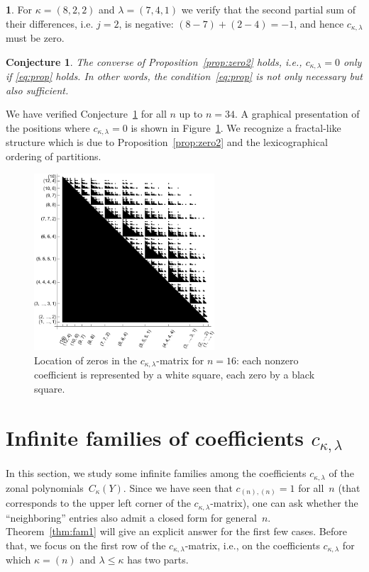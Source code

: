 \documentclass[10pt,oneside,american]{amsart}
\numberwithin{equation}{section}
\numberwithin{figure}{section}
\theoremstyle{plain}
\theoremstyle{definition}
\theoremstyle{remark}
\theoremstyle{plain}
\theoremstyle{definition}
\newtheorem{example}[thm]{\protect\examplename}
\theoremstyle{plain}
\theoremstyle{plain}
\newtheorem{conj}[thm]{Conjecture}
\providecommand{\examplename}{Example}
\begin{document}
\begin{example}
  For $\kappa=(8,2,2)$ and $\lambda=(7,4,1)$ we verify that the second
  partial sum of their differences, i.e. $j=2$, is negative:
  $(8-7)+(2-4)=-1$, and hence $c_{\kappa,\lambda}$ must be zero.
\end{example}

\begin{conj}\label{conj:}
  The converse of Proposition~\eqref{prop:zero2} holds, i.e.,
  $c_{\kappa,\lambda}=0$ only if \eqref{eq:prop} holds. In other words, the
  condition~\eqref{eq:prop} is not only necessary but also sufficient.
\end{conj}

We have verified Conjecture~\ref{conj:} for all $n$ up to $n=34$.  A graphical
presentation of the positions where $c_{\kappa,\lambda}=0$ is shown in
Figure~\ref{fig:zeros}. We recognize a fractal-like structure which is due to
Proposition~\ref{prop:zero2} and the lexicographical ordering of partitions.

\begin{figure}
  \begin{center}
    \includegraphics[width=0.6\textwidth]{zeros.pdf}
  \end{center}
  \caption{Location of zeros in the $c_{\kappa,\lambda}$-matrix for $n=16$:
  each nonzero coefficient is represented by a white square, each zero
  by a black square.}
  \label{fig:zeros}
\end{figure}


\section{Infinite families of coefficients $c_{\kappa,\lambda}$}

In this section, we study some infinite families among the coefficients
$c_{\kappa,\lambda}$ of the zonal polynomials~$C_{\kappa}(Y)$. Since we have
seen that $c_{(n),(n)}=1$ for all~$n$ (that corresponds to the upper left
corner of the $c_{\kappa,\lambda}$-matrix), one can ask whether the
``neighboring'' entries also admit a closed form for general~$n$.
Theorem~\ref{thm:fam1} will give an explicit answer for the first few cases.
Before that, we focus on the first row of the $c_{\kappa,\lambda}$-matrix,
i.e., on the coefficients $c_{\kappa,\lambda}$ for which
$\kappa=\left(n\right)$ and $\lambda\leq\kappa$ has two parts.
\end{document}
